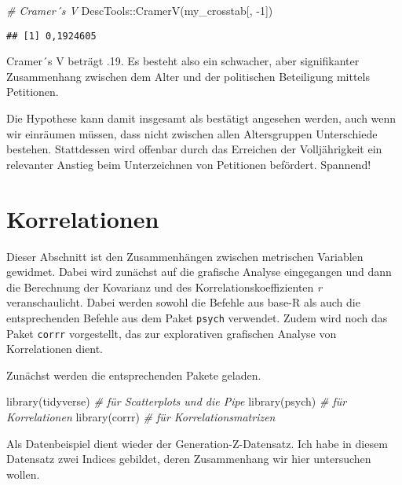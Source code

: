 \documentclass[
]{book}
\newenvironment{Shaded}{\begin{snugshade}}{\end{snugshade}}
\newcommand{\CommentTok}[1]{\textcolor[rgb]{0.56,0.35,0.01}{\textit{#1}}}
\newcommand{\DecValTok}[1]{\textcolor[rgb]{0.00,0.00,0.81}{#1}}
\newcommand{\FunctionTok}[1]{\textcolor[rgb]{0.00,0.00,0.00}{#1}}
\newcommand{\NormalTok}[1]{#1}
\newcommand{\SpecialCharTok}[1]{\textcolor[rgb]{0.00,0.00,0.00}{#1}}
\begin{document}
\begin{Shaded}
\begin{Highlighting}[]
\CommentTok{\# Cramer´s V}
\NormalTok{DescTools}\SpecialCharTok{::}\FunctionTok{CramerV}\NormalTok{(my\_crosstab[, }\SpecialCharTok{{-}}\DecValTok{1}\NormalTok{])}
\end{Highlighting}
\end{Shaded}

\begin{verbatim}
## [1] 0,1924605
\end{verbatim}

Cramer´s V beträgt .19. Es besteht also ein schwacher, aber signifikanter Zusammenhang zwischen dem Alter und der politischen Beteiligung mittels Petitionen.

Die Hypothese kann damit insgesamt als bestätigt angesehen werden, auch wenn wir einräumen müssen, dass nicht zwischen allen Altersgruppen Unterschiede bestehen.
Stattdessen wird offenbar durch das Erreichen der Volljährigkeit ein relevanter Anstieg beim Unterzeichnen von Petitionen befördert. Spannend!

\hypertarget{korrelationen}{%
\section{Korrelationen}\label{korrelationen}}

Dieser Abschnitt ist den Zusammenhängen zwischen metrischen Variablen gewidmet. Dabei wird zunächst auf die grafische Analyse eingegangen und dann die Berechnung der Kovarianz und des Korrelationskoeffizienten \emph{r} veranschaulicht. Dabei werden sowohl die Befehle aus base-R als auch die entsprechenden Befehle aus dem Paket \texttt{psych} verwendet. Zudem wird noch das Paket \texttt{corrr} vorgestellt, das zur explorativen grafischen Analyse von Korrelationen dient.

Zunächst werden die entsprechenden Pakete geladen.

\begin{Shaded}
\begin{Highlighting}[]
\FunctionTok{library}\NormalTok{(tidyverse) }\CommentTok{\# für Scatterplots und die Pipe}
\FunctionTok{library}\NormalTok{(psych)     }\CommentTok{\# für Korrelationen}
\FunctionTok{library}\NormalTok{(corrr)     }\CommentTok{\# für Korrelationsmatrizen}
\end{Highlighting}
\end{Shaded}

Als Datenbeispiel dient wieder der Generation-Z-Datensatz. Ich habe in diesem Datensatz zwei Indices gebildet, deren Zusammenhang wir hier untersuchen wollen.
\end{document}
